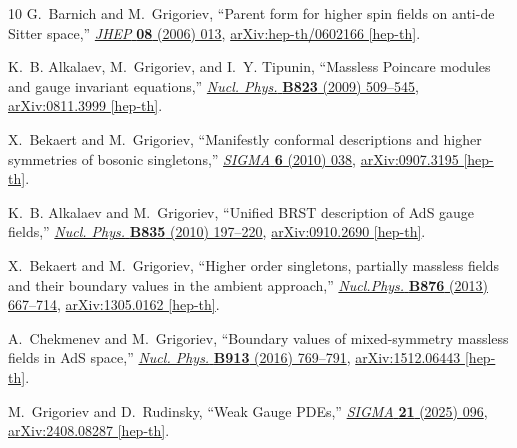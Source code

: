 \documentclass[a4paper,12pt]{article}
\numberwithin{equation}{section} %
\begin{document}
\begin{thebibliography}{10}
G.~Barnich and M.~Grigoriev, ``{P}arent form for higher spin fields on anti-de {S}itter space,'' \href{http://dx.doi.org/10.1088/1126-6708/2006/08/013}{{\em JHEP} {\bfseries 08} (2006) 013},
\href{http://arxiv.org/abs/hep-th/0602166}{{\ttfamily arXiv:hep-th/0602166 [hep-th]}}.

K.~B. Alkalaev, M.~Grigoriev, and I.~Y. Tipunin, ``{M}assless {P}oincare modules and gauge invariant equations,'' \href{http://dx.doi.org/10.1016/j.nuclphysb.2009.08.007}{{\em Nucl. Phys.} {\bfseries B823} (2009) 509--545},
\href{http://arxiv.org/abs/0811.3999}{{\ttfamily arXiv:0811.3999 [hep-th]}}.

X.~Bekaert and M.~Grigoriev, ``{M}anifestly conformal descriptions and higher symmetries of bosonic singletons,'' \href{http://dx.doi.org/10.3842/SIGMA.2010.038}{{\em SIGMA} {\bfseries 6} (2010) 038},
\href{http://arxiv.org/abs/0907.3195}{{\ttfamily arXiv:0907.3195 [hep-th]}}.

K.~B. Alkalaev and M.~Grigoriev, ``{U}nified {BRST} description of {A}d{S} gauge fields,'' \href{http://dx.doi.org/10.1016/j.nuclphysb.2010.04.004}{{\em Nucl. Phys.} {\bfseries B835} (2010) 197--220},
\href{http://arxiv.org/abs/0910.2690}{{\ttfamily arXiv:0910.2690 [hep-th]}}.

X.~Bekaert and M.~Grigoriev, ``{H}igher order singletons, partially massless fields and their boundary values in the ambient approach,'' \href{http://dx.doi.org/10.1016/j.nuclphysb.2013.08.015}{{\em Nucl.Phys.} {\bfseries B876} (2013) 667--714},
\href{http://arxiv.org/abs/1305.0162}{{\ttfamily arXiv:1305.0162 [hep-th]}}.

A.~Chekmenev and M.~Grigoriev, ``{Boundary values of mixed-symmetry massless fields in AdS space},'' \href{http://dx.doi.org/10.1016/j.nuclphysb.2016.10.006}{{\em Nucl. Phys.} {\bfseries B913} (2016) 769--791},
\href{http://arxiv.org/abs/1512.06443}{{\ttfamily arXiv:1512.06443 [hep-th]}}.

M.~Grigoriev and D.~Rudinsky, ``{Weak Gauge PDEs},'' \href{http://dx.doi.org/10.3842/SIGMA.2025.096}{{\em SIGMA} {\bfseries 21} (2025) 096}, \href{http://arxiv.org/abs/2408.08287}{{\ttfamily arXiv:2408.08287 [hep-th]}}.


\end{thebibliography}
\end{document}
